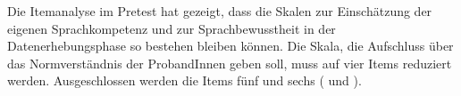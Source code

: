 Die Itemanalyse im Pretest hat gezeigt, dass die Skalen zur Einschätzung der eigenen Sprachkompetenz und zur Sprachbewusstheit in der Datenerhebungsphase so bestehen bleiben können. Die Skala, die Aufschluss über das Normverständnis der ProbandInnen geben soll, muss auf vier Items reduziert werden. Ausgeschlossen werden die Items fünf und sechs ( und ).
